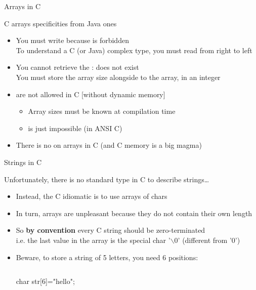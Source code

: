 \begin{Coupe}
\begin{frame}{Arrays in C}
  \begin{block}{C arrays specificities from Java ones} 
    \begin{itemize}
    \item You must write  because  is forbidden\\
      To understand a C (or Java) complex type, you must read from right to
      left
    \item You cannot retrieve the : 
      does not exist\\
      You must store the array size alongside to the array, in an integer
    \item {} are not allowed in C [without dynamic
      memory]
      \begin{itemize}
      \item Array sizes must be known at compilation time
      \item {} is just impossible (in ANSI C)
      \end{itemize}
    \item There is \alert{no}  on arrays in C 
      {\small(and C memory is a big magma)}
    \end{itemize}
  \end{block}
\end{frame}
\begin{frame}[fragile]{Strings in C}
  \begin{block}{Unfortunately, there is no standard type in C to describe strings\ldots}
    \begin{itemize}
    \item Instead, the C idiomatic is to use \alert{arrays of chars}
    \item In turn, arrays are unpleasant because they do not contain their own
      length
    \item So \textbf{\alert{by convention}} every C string should be
      zero-terminated\\
      {\small i.e. the last value in the array is the special char '$\backslash$0'
        (different from '0')}
    \item Beware, to store a string of 5 letters, you need 6 positions:
      \medskip
      \begin{columns}
        \begin{column}{.35\linewidth}
          \begin{boitecode}{}
char str[6]="hello";            


\end{boitecode}
\end{column}
\end{columns}
\end{itemize}
\end{block}
\end{frame}
\end{Coupe}
